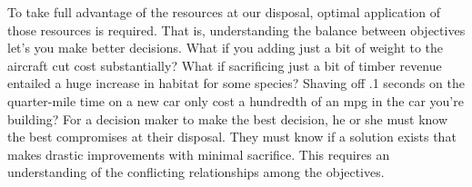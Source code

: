 To take full advantage of the resources at our disposal, optimal application of those resources is required. That is, understanding the balance between objectives let's you make better decisions. What if you adding just a bit of weight to the aircraft cut cost substantially? What if sacrificing just a bit of timber revenue entailed a huge increase in habitat for some species? Shaving off .1 seconds on the quarter-mile time on a new car only cost a hundredth of an mpg in the car you're building? For a decision maker to make the best decision, he or she must know the best compromises at their disposal. They must know if a solution exists that makes drastic improvements with minimal sacrifice. This requires an understanding of the conflicting relationships among the objectives.

